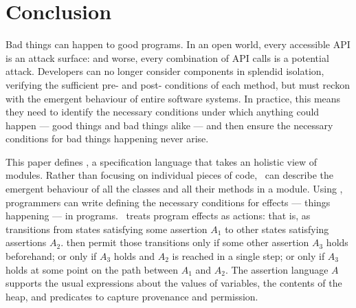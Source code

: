 \section{Conclusion}
\label{s:conclusion}

Bad things can happen to good programs. In an open world, every
accessible API is an attack surface: and worse, every combination of
API calls is a potential attack.  Developers can no longer consider
components in splendid isolation, verifying the sufficient pre- and
post- conditions of each method, but must reckon with the emergent
behaviour of entire software systems. In practice, this means they
need to identify the necessary conditions under which anything could
happen\cite{anything} --- good things and bad things alike --- and
then ensure the necessary conditions for bad things happening never arise.



This paper defines \Chainmail, a specification language that takes an
holistic view of modules. Rather than focusing on individual pieces
of code, \Chainmail\ can describe the emergent behaviour of all the
classes and all their methods in a module.
Using \Chainmail,
programmers can write \NecessitySpecifications defining the necessary
conditions for effects --- things happening --- in programs.
\Chainmail\ treats program effects as actions:
that is, as transitions from states satisfying some assertion 
$A_1$ to other states satisfying assertions $A_2$. 
\NecessitySpecifications then permit those transitions
only if some other assertion $A_3$ holds beforehand;
or only if $A_3$ holds and $A_2$ is reached in a single step;
or only if $A_3$ holds at some point on the path between
$A_1$ and $A_2$.
The assertion language $A$ supports the usual expressions about the
values of variables, the contents of the heap, and predicates
to capture provenance and permission.



